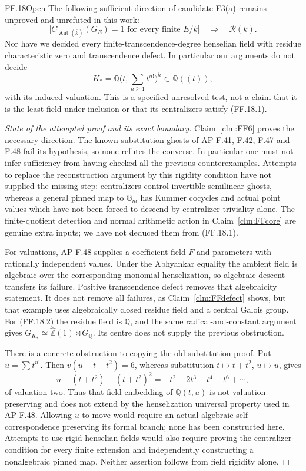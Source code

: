 \begin{claim}{FF.18}{Open}\label{clm:FFremaining}
The following sufficient direction of candidate F3(a) remains
unproved and unrefuted in this work:
\[
 \bigl[C_{\operatorname{Aut}(\bar k)}(G_E)=1
          \text{ for every finite }E/k\bigr]
                  \quad\Longrightarrow\quad\mathcal R(k).
\tag{FF.18.1}
\]
Nor have we decided every finite-transcendence-degree henselian
field with residue characteristic zero and transcendence defect.
In particular our arguments do not decide
\[
 K_* = \mathbb Q\bigl(t,\sum_{n\geq1}t^{n!}\bigr)^h
           \subset\mathbb Q((t)),
\tag{FF.18.2}
\]
with its induced valuation. This is a specified unresolved test,
not a claim that it is the least field under inclusion or that
its centralizers satisfy (FF.18.1).
\end{claim}
\begin{proof}[State of the attempted proof and its exact boundary]
Claim~\ref{clm:FF6} proves the necessary direction. The known
substitution ghosts of AP-F.41, F.42, F.47 and F.48 fail its
hypothesis, so none refutes the converse. In particular one must
not infer sufficiency from having checked all the previous
counterexamples. Attempts to replace the reconstruction argument
by this rigidity condition have not supplied the missing step:
centralizers control invertible semilinear ghosts, whereas a
general pinned map to \(\mathbb G_m\) has Kummer cocycles and
actual point values which have not been forced to descend by
centralizer triviality alone. The finite-quotient detection and
normal arithmetic action in Claim~\ref{clm:FFcore} are genuine
extra inputs; we have not deduced them from (FF.18.1).

For valuations, AP-F.48 supplies a coefficient field \(F\) and
parameters with rationally independent values. Under the
Abhyankar equality the ambient field is algebraic over the
corresponding monomial henselization, so algebraic descent
transfers its failure. Positive transcendence defect removes
that algebraicity statement. It does not remove all failures,
as Claim~\ref{clm:FFdefect} shows, but that example uses
algebraically closed residue field and a central Galois group.
For (FF.18.2) the residue field is \(\mathbb Q\), and the
same radical-and-constant argument gives
\(G_{K_*}\simeq\widehat{\mathbb Z}(1)\rtimes G_{\mathbb Q}\).
Its centre does not supply the previous obstruction.

There is a concrete obstruction to copying the old substitution
proof. Put \(u=\sum t^{n!}\). Then
\(v(u-t-t^2)=6\), whereas substitution
\(t\mapsto t+t^2\), \(u\mapsto u\), gives
\[
 u-(t+t^2)-(t+t^2)^2
       =-t^2-2t^3-t^4+t^6+\cdots,
\]
of valuation two. Thus that field embedding of
\(\mathbb Q(t,u)\) is not valuation preserving and does not
extend by the henselization universal property used in AP-F.48.
Allowing \(u\) to move would require an actual algebraic
self-correspondence preserving its formal branch; none has been
constructed here. Attempts to use rigid henselian fields would
also require proving the centralizer condition for every finite
extension and independently constructing a nonalgebraic pinned
map. Neither assertion follows from field rigidity alone.


\end{proof}
